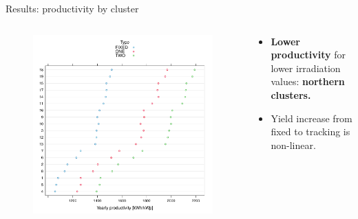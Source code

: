 \documentclass{beamer}%
\begin{document}
\begin{frame}[fragile]{Results: productivity by cluster}
  \begin{columns}
    \begin{column}{0.5\textwidth}
      \begin{figure}
        \includegraphics[scale=0.35]{productivity_bycluster_andtype.pdf}
      \end{figure}
    \end{column}
\begin{column}{0.5\textwidth}
\vspace{1.5\baselineskip}  
 \begin{itemize}
 \item <1,2> \textbf{Lower productivity} for lower irradiation values: \textbf{northern clusters.}
 \item <2> Yield increase from fixed to tracking is \alert{non-linear}.
  \end{itemize}  
   \end{column}
  \end{columns}
\end{frame}
\end{document}
